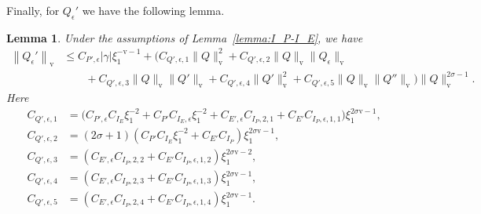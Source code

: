 \documentclass[11pt]{article}
\newcommand{\normv}{\mathrm{v}}
\newtheorem{lemma}[definition]{Lemma}
\begin{document}
Finally, for \(Q_{\epsilon}'\) we have the following lemma.
\begin{lemma}\label{lemma:norm-Q-depsilon-dxi}
  Under the assumptions of Lemma~\ref{lemma:I_P-I_E}, we have
  \begin{align*}
    \left\|Q_{\epsilon}'\right\|_{\normv}
    &\leq C_{P',\epsilon}|\gamma|\xi_{1}^{-\normv - 1}
      + \Bigg(
      C_{Q',\epsilon,1}\|Q\|_{\normv}^{2}
      + C_{Q',\epsilon,2}\|Q\|_{\normv}\|Q_{\epsilon}\|_{\normv}\\
    &\qquad+ C_{Q',\epsilon,3}\|Q\|_{\normv}\|Q'\|_{\normv}
      + C_{Q',\epsilon,4}\|Q'\|_{\normv}^{2}
      + C_{Q',\epsilon,5}\|Q\|_{\normv}\|Q''\|_{\normv}
      \Bigg)\|Q\|_{\normv}^{2\sigma - 1}.
  \end{align*}
  Here
  \begin{align*}
    C_{Q',\epsilon,1}
    &= \Big(
      C_{P',\epsilon}C_{I_{E}}\xi_{1}^{-2}
      + C_{P'}C_{I_{E},\epsilon}\xi_{1}^{-2}
      + C_{E',\epsilon}C_{I_{P},2,1}
      + C_{E'}C_{I_{P},\epsilon,1,1}
      \Big)\xi_{1}^{2\sigma\normv - 1},\\
    C_{Q',\epsilon,2}
    &=
      (2\sigma + 1)(
      C_{P'}C_{I_{E}}\xi_{1}^{-2}
      + C_{E'}C_{I_{P}})\xi_{1}^{2\sigma\normv - 1},\\
    C_{Q',\epsilon,3}
    &=
      (
      C_{E',\epsilon}C_{I_{P},2,2}
      + C_{E'}C_{I_{P},\epsilon,1,2}
      )\xi_{1}^{2\sigma\normv - 2},\\
    C_{Q',\epsilon,4}
    &=
      (
      C_{E',\epsilon}C_{I_{P},2,3}
      + C_{E'}C_{I_{P},\epsilon,1,3}
      )\xi_{1}^{2\sigma\normv - 1},\\
    C_{Q',\epsilon,5}
    &=
      (
      C_{E',\epsilon}C_{I_{P},2,4}
      + C_{E'}C_{I_{P},\epsilon,1,4}
      )\xi_{1}^{2\sigma\normv - 1}.
  \end{align*}
\end{lemma}
\end{document}
